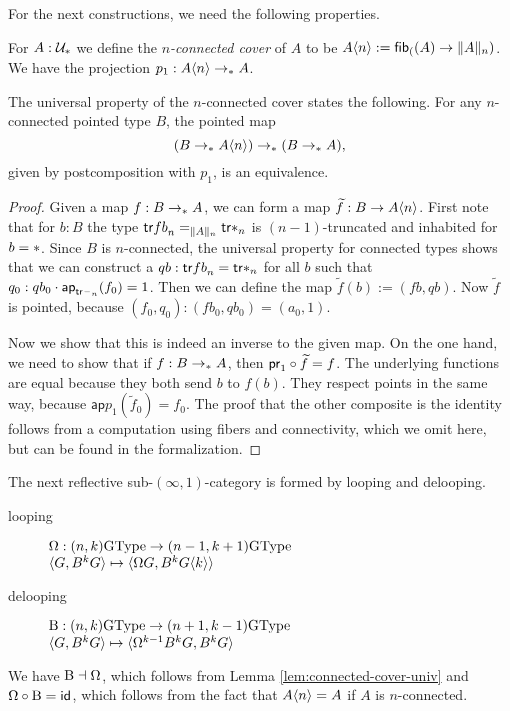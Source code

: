 For the next constructions, we need the following properties.
\begin{defn}
  For $A : \UU_\pt$ we define the \emph{$n$-connected cover} of $A$ to be 
  $A{\angled n} := \fib(A \to \trunc{n}{A})$. We have the projection $p_1: A{\angled n} \to_\pt A$.
\end{defn}
\begin{lem} \label{lem:connected-cover-univ}
  The universal property of the $n$-connected cover states the following. For any $n$-connected pointed type $B$, the pointed map
  $$(B \to_\pt A{\angled n}) \to_\pt (B \to_\pt A),$$
  given by postcomposition with $p_1$, is an equivalence.\\
\end{lem}
\begin{proof}
  Given a map $f:B\to_\pt A$, we can form a map $\widetilde f: B \to A{\angled n}$. First note that for $b:B$ the type $\tr{fb}_n=_{\trunc{n}{A}}\tr{\pt}_n$ is $(n-1)$-truncated and inhabited for $b=\pt$. Since $B$ is $n$-connected, the universal property for connected types shows that we can construct a $qb:\tr{fb}_n=\tr{\pt}_n$ for all $b$ such that $q_0:qb_0\cdot\mathsf{ap}_{\tr{\blank}_n}(f_0)=1$. Then we can define the map $\widetilde f(b):=(fb, qb)$. Now $\widetilde f$ is pointed, because $(f_0,q_0):(fb_0,qb_0)=(a_0,1)$.

  Now we show that this is indeed an inverse to the given map. On the one hand, we need to show that if $f: B \to_\pt A$, then $\proj 1 \circ \widetilde f=f$. The underlying functions are equal because they both send $b$ to $f(b)$. They respect points in the same way, because
  $\mathsf{ap}{p_1}(\widetilde f_0)=f_0$. The proof that the other composite is the identity follows from a computation using fibers and connectivity, which we omit here, but can be found in the formalization.
\end{proof}
The next reflective sub-$(\infty,1)$-category is formed by looping and delooping.
\begin{description}
\item[looping] $\Omega : (n,k)\GType \to (n-1,k+1)\GType$ \\
  $\angled{G,B^kG} \mapsto \angled{\Omega G,B^kG{\angled k}}$
\item[delooping] $\B : (n,k)\GType \to (n+1,k-1)\GType$ \\
  $\angled{G,B^kG} \mapsto \angled{\Omega^{k-1}B^kG,B^kG}$
\end{description}
We have ${\B} \dashv {\Omega}$, which follows from Lemma \ref{lem:connected-cover-univ} %
and $\Omega\circ{\B} = \idfunc$, which follows from the fact that $A{\angled n}=A$ if $A$ is $n$-connected.

